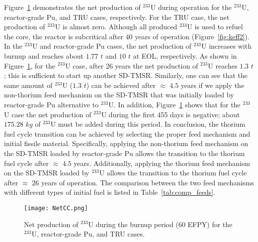 Figure~\ref{fig:NetCC} demonstrates the net production of $^{233}$U during 
operation for the $^{233}$U, reactor-grade Pu, and TRU cases, respectively. For the TRU case, the net production of $^{233}$U is almost 
zero. 
Although all produced $^{233}$U is used to refuel the core, the reactor is subcritical after $40$ years of operation (Figure~\ref{fig:keff2}).
In the $^{233}$U and reactor-grade Pu cases, the net production of 
$^{233}$U increases with burnup and reaches about $1.77$ $t$ and $10$ $t$ at EOL, respectively. As shown in 
Figure~\ref{fig:NetCC}, for the $^{233}$U case, after 26 years the net production of $^{233}$U reaches 
$1.3$ $t$; this is sufficient to start up another \gls{SD-TMSR}. Similarly, 
one can see that the same amount of $^{233}$U ($1.3$ $t$) can be achieved 
after $\approx$ $4.5$ years if we apply the non-thorium feed mechanism on 
the SD-TMSR that was initially loaded by reactor-grade Pu alternative to 
$^{233}$U. In addition, Figure~\ref{fig:NetCC} shows that for the $^{233}$U 
case the net production of $^{233}$U during the first 455 days is negative; 
about $175.28$ $kg$ of $^{233}$U must be added during this period. 
In conclusion, the thorium fuel cycle transition can be achieved by selecting the 
proper feed mechanism and initial fissile material. 
Specifically, applying the non-thorium feed mechanism on 
the SD-TMSR loaded by reactor-grade Pu allows the 
transition to the thorium fuel cycle after $\approx$ 
$4.5$ years. Additionally, applying the thorium feed mechanism on 
the SD-TMSR loaded by $^{233}$U allows the 
transition to the thorium fuel cycle after $\approx$ $26$ years of operation. 
The comparison between the two feed mechanisms with different types of initial 
fuel is listed in Table~\ref{tab:comp_feeds}. 

\begin{figure}
	\centering
	\texttt{[image: NetCC.png]}
	\caption{Net production of $^{233}$U during the burnup period (60 \gls{EFPY}) for the $^{233}$U, reactor-grade Pu, and TRU cases.}
	\label{fig:NetCC}
\end{figure}


